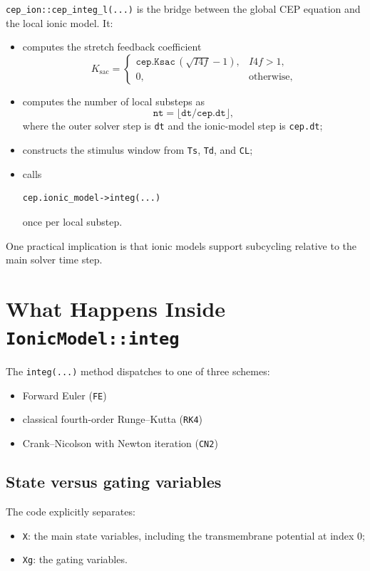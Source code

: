 \documentclass[11pt]{article}
\begin{document}
\texttt{cep\_ion::cep\_integ\_l(...)} is the bridge between the global CEP equation and the local ionic model. It:
\begin{itemize}[leftmargin=*]
\item computes the stretch feedback coefficient
\[
K_{\mathrm{sac}} =
\begin{cases}
\texttt{cep.Ksac}\,(\sqrt{I4f}-1), & I4f > 1, \\
0, & \text{otherwise},
\end{cases}
\]
\item computes the number of local substeps as
\[
\texttt{nt} = \lfloor \texttt{dt} / \texttt{cep.dt} \rfloor,
\]
where the outer solver step is \texttt{dt} and the ionic-model step is \texttt{cep.dt};
\item constructs the stimulus window from \texttt{Ts}, \texttt{Td}, and \texttt{CL};
\item calls
\begin{verbatim}
cep.ionic_model->integ(...)
\end{verbatim}
once per local substep.
\end{itemize}

One practical implication is that ionic models support subcycling relative to the main solver time step.

\section{What Happens Inside \texttt{IonicModel::integ}}

The \texttt{integ(...)} method dispatches to one of three schemes:
\begin{itemize}[leftmargin=*]
\item Forward Euler (\texttt{FE})
\item classical fourth-order Runge--Kutta (\texttt{RK4})
\item Crank--Nicolson with Newton iteration (\texttt{CN2})
\end{itemize}

\subsection{State versus gating variables}

The code explicitly separates:
\begin{itemize}[leftmargin=*]
\item \texttt{X}: the main state variables, including the transmembrane potential at index 0;
\item \texttt{Xg}: the gating variables.
\end{itemize}
\end{document}
